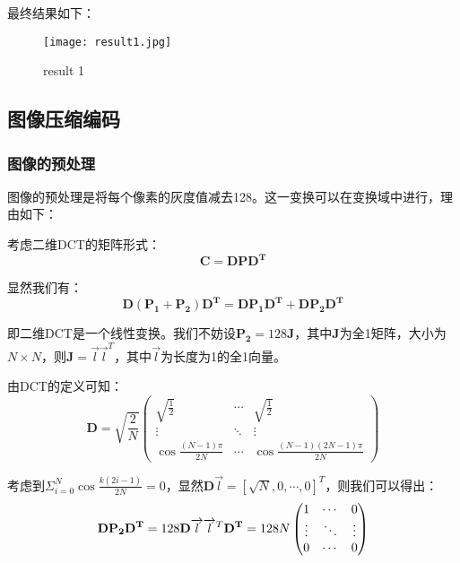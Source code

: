 \documentclass[a4paper]{article}
\begin{document}
\par 最终结果如下：
\begin{figure}[ht]
     \centering
     \texttt{[image: result1.jpg]}
     \caption{result 1}
    \label{fig:result 1}
\end{figure}

\subsection{图像压缩编码}

\subsubsection{图像的预处理}
\par 图像的预处理是将每个像素的灰度值减去128。这一变换可以在变换域中进行，理由如下：
\par 考虑二维DCT的矩阵形式：
\begin{equation}
    \mathbf{C} = \mathbf{D}\mathbf{P}\mathbf{D^T}
\end{equation}
\par 显然我们有：
\begin{equation}
    \mathbf{D}(\mathbf{P_1}+\mathbf{P_2})\mathbf{D^T} = \mathbf{D}\mathbf{P_1}\mathbf{D^T} + \mathbf{D}\mathbf{P_2}\mathbf{D^T}
\end{equation}
\par 即二维DCT是一个线性变换。我们不妨设$\mathbf{P_2} = 128\mathbf{J}$，其中$\mathbf{J}$为全1矩阵，大小为$N \times N$，则$\mathbf{J} = \overrightarrow{l}\overrightarrow{l}^T$，其中$ \overrightarrow{l}$为长度为1的全1向量。
\par 由DCT的定义可知：
\begin{equation}
    \mathbf{D} = \sqrt{\frac{2}{N}}\begin{pmatrix}
    \sqrt{\frac{1}{2}} & \cdots & \sqrt{\frac{1}{2}} \\
    \vdots & \ddots & \vdots \\
    \cos\frac{(N-1)\pi}{2N} & \cdots & \cos\frac{(N-1)(2N-1)\pi}{2N}
    \end{pmatrix}
\end{equation}
\par 考虑到$\Sigma_{i=0}^{N}\cos \frac{k(2i-1)}{2N} = 0$，显然$\mathbf{D}\overrightarrow{l} = [\sqrt{N}, 0, \cdots, 0]^T$，则我们可以得出：
\begin{equation}
    \mathbf{D}\mathbf{P_2}\mathbf{D^T} = \\
    128\mathbf{D}\overrightarrow{l}\overrightarrow{l}^T\mathbf{D^T} = \\
    128N\begin{pmatrix}
    1 & \cdots & 0 \\
    \vdots & \ddots & \vdots \\
    0 & \cdots & 0
    \end{pmatrix}
\end{equation}
\end{document}
